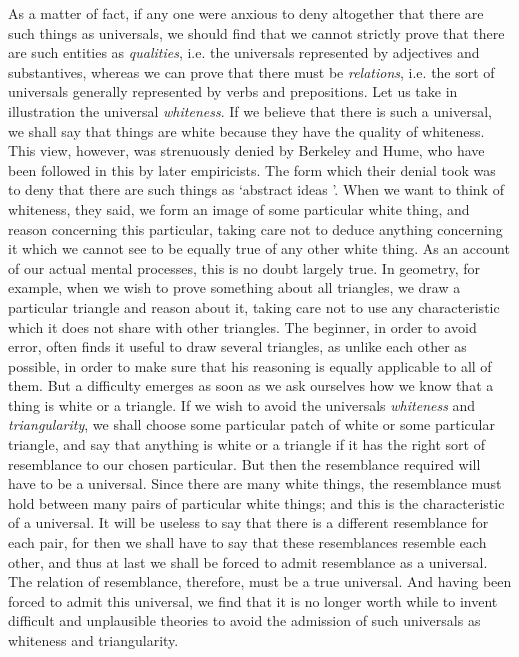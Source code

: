 \documentclass[oneside,letterpaper,12pt]{book}
\begin{document}
As a matter of fact, if any one were anxious to deny altogether that
there are such things as universals, we should find that we cannot
strictly prove that there are such entities as \emph{qualities}, i.e.
the universals represented by adjectives and substantives, whereas we
can prove that there must be \emph{relations}, i.e. the sort of
universals generally represented by verbs and prepositions. Let us take
in illustration the universal \emph{whiteness}. If we believe that there
is such a universal, we shall say that things are white because they
have the quality of whiteness. This view, however, was strenuously
denied by Berkeley and Hume, who have been followed in this by later
empiricists. \label{resemblances} The form which their denial took was to deny that there are
such things as `abstract ideas '. When we
want to think of whiteness, they said, we form an image of some
particular white thing, and reason concerning this particular, taking
care not to deduce anything concerning it which we cannot see to be
equally true of any other white thing. As an account of our actual
mental processes, this is no doubt largely true. In geometry, for
example, when we wish to prove something about all triangles, we draw a
particular triangle and reason about it, taking care not to use any
characteristic which it does not share with other triangles. The
beginner, in order to avoid error, often finds it useful to draw several
triangles, as unlike each other as possible, in order to make sure that
his reasoning is equally applicable to all of them. \label{regress} But a difficulty
emerges as soon as we ask ourselves how we know that a thing is white or
a triangle. If we wish to avoid the universals \emph{whiteness} and
\emph{triangularity}, we shall choose some particular patch of white or
some particular triangle, and say that anything is white or a triangle
if it has the right sort of resemblance to our chosen particular. But
then the resemblance required will have to be a universal. Since there
are many white things, the resemblance must hold between many pairs of
particular white things; and this is the characteristic of a universal.
It will be useless to say that there is a different resemblance for each
pair, for then we shall have to say that these resemblances resemble
each other, and thus at last we shall be forced to admit resemblance as
a universal. The relation of resemblance, therefore, must be a true
universal. And having been forced to admit this universal, we find that
it is no longer worth while to invent difficult and unplausible theories
to avoid the admission of such universals as whiteness and
triangularity.
\end{document}
